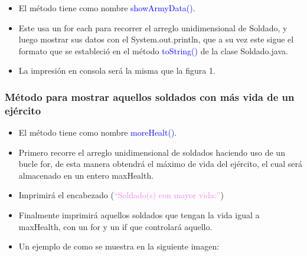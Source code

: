 \documentclass{article}
\begin{document}
        \begin{itemize}
            \item El método tiene como nombre \textcolor{blue}{showArmyData()}.
            \item Este usa un for each para recorrer el arreglo unidimensional de Soldado, y luego mostrar sus datos con el System.out.println, que a su vez este sigue el formato que se estableció en el método \textcolor{blue}{toString()} de la clase Soldado.java.
            \item La impresión en consola será la misma que la figura 1.
        \end{itemize}

        
        
        
        \subsubsection{Método para mostrar aquellos soldados con más vida de un ejército}

        \begin{itemize}
            \item El método tiene como nombre \textcolor{blue}{moreHealt()}.
            \item Primero recorre el arreglo unidimensional de soldados haciendo uso de un bucle for, de esta manera obtendrá el máximo de vida del ejército, el cual será almacenado en un entero maxHealth.
            \item Imprimirá el encabezado (\textcolor{violet}{``Soldado(s) con mayor vida:''})
            \item Finalmente imprimirá aquellos soldados que tengan la vida igual a maxHealth, con un for y un if que controlará aquello.

        \end{itemize}

        

        \begin{itemize}
            \begin{itemize}
                \item Un ejemplo de como se muestra en la siguiente imagen:
            \end{itemize}
        \end{itemize}
\end{document}
